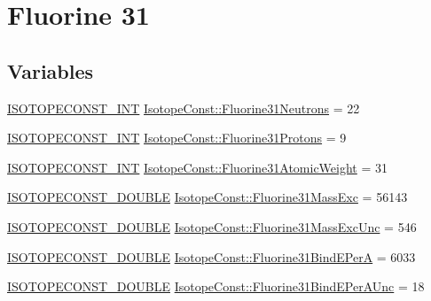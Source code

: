 \hypertarget{group___isotope_const-_fluorine-_f31}{}\section{Fluorine 31}
\label{group___isotope_const-_fluorine-_f31}
\subsection*{Variables}
\begin{DoxyCompactItemize}
\item 
\mbox{\hyperlink{group___isotope_const-_macros_ga5f18360b3e99483a35c32d789e62621c}{I\+S\+O\+T\+O\+P\+E\+C\+O\+N\+S\+T\+\_\+\+I\+NT}} \mbox{\hyperlink{group___isotope_const-_fluorine-_f31_ga30fee3e12f2111f5edaccc2278cbc4e6}{Isotope\+Const\+::\+Fluorine31\+Neutrons}} = 22
\item 
\mbox{\hyperlink{group___isotope_const-_macros_ga5f18360b3e99483a35c32d789e62621c}{I\+S\+O\+T\+O\+P\+E\+C\+O\+N\+S\+T\+\_\+\+I\+NT}} \mbox{\hyperlink{group___isotope_const-_fluorine-_f31_gae2a4677b2cb1f6eb358e94be98151d31}{Isotope\+Const\+::\+Fluorine31\+Protons}} = 9
\item 
\mbox{\hyperlink{group___isotope_const-_macros_ga5f18360b3e99483a35c32d789e62621c}{I\+S\+O\+T\+O\+P\+E\+C\+O\+N\+S\+T\+\_\+\+I\+NT}} \mbox{\hyperlink{group___isotope_const-_fluorine-_f31_ga704786215b7a9b4dbef0723d32327a66}{Isotope\+Const\+::\+Fluorine31\+Atomic\+Weight}} = 31
\item 
\mbox{\hyperlink{group___isotope_const-_macros_ga8f45a7272ce02c0b4c65c44636ed719a}{I\+S\+O\+T\+O\+P\+E\+C\+O\+N\+S\+T\+\_\+\+D\+O\+U\+B\+LE}} \mbox{\hyperlink{group___isotope_const-_fluorine-_f31_gaa2f0b093a8e13b9fc29731be2f6fcfeb}{Isotope\+Const\+::\+Fluorine31\+Mass\+Exc}} = 56143
\item 
\mbox{\hyperlink{group___isotope_const-_macros_ga8f45a7272ce02c0b4c65c44636ed719a}{I\+S\+O\+T\+O\+P\+E\+C\+O\+N\+S\+T\+\_\+\+D\+O\+U\+B\+LE}} \mbox{\hyperlink{group___isotope_const-_fluorine-_f31_ga7ca988285f30b7955f08ab7079242639}{Isotope\+Const\+::\+Fluorine31\+Mass\+Exc\+Unc}} = 546
\item 
\mbox{\hyperlink{group___isotope_const-_macros_ga8f45a7272ce02c0b4c65c44636ed719a}{I\+S\+O\+T\+O\+P\+E\+C\+O\+N\+S\+T\+\_\+\+D\+O\+U\+B\+LE}} \mbox{\hyperlink{group___isotope_const-_fluorine-_f31_ga59cc6453af590dd2fe8c74cc0df6cbf4}{Isotope\+Const\+::\+Fluorine31\+Bind\+E\+PerA}} = 6033
\item 
\mbox{\hyperlink{group___isotope_const-_macros_ga8f45a7272ce02c0b4c65c44636ed719a}{I\+S\+O\+T\+O\+P\+E\+C\+O\+N\+S\+T\+\_\+\+D\+O\+U\+B\+LE}} \mbox{\hyperlink{group___isotope_const-_fluorine-_f31_ga9a9df1c16e80b18b9efbf766866b9d0c}{Isotope\+Const\+::\+Fluorine31\+Bind\+E\+Per\+A\+Unc}} = 18

\end{DoxyCompactItemize}
